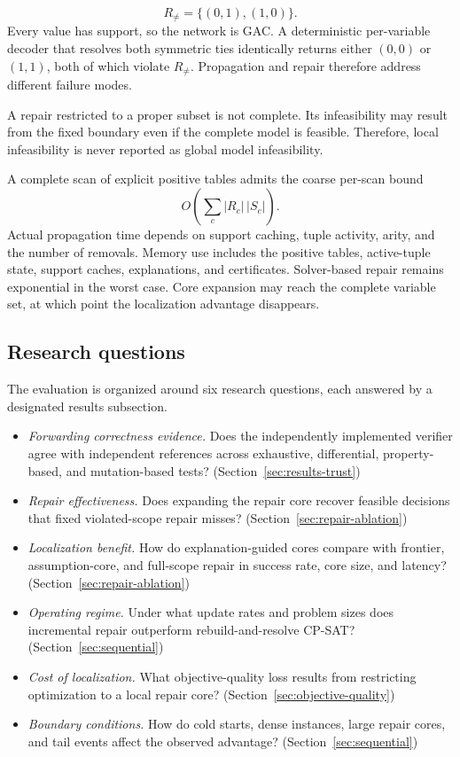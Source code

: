 \documentclass[pdflatex,sn-mathphys-num,iicol,oneside]{sn-jnl}
\newcommand{\gac}{\textsc{GAC}\xspace}
\newcommand{\cpsat}{\textsc{CP-SAT}\xspace}
\begin{document}
\[
R_{\neq}=\{(0,1),(1,0)\}.
\]
Every value has support, so the network is \gac. A deterministic
per-variable decoder that resolves both symmetric ties identically
returns either $(0,0)$ or $(1,1)$, both of which violate
$R_{\neq}$. Propagation and repair therefore address different
failure modes.

A repair restricted to a proper subset is not complete. Its
infeasibility may result from the fixed boundary even if the complete
model is feasible. Therefore, local infeasibility is never reported as
global model infeasibility.

A complete scan of explicit positive tables admits the coarse per-scan bound
\begin{equation}
O\left(
\sum_{c}
|R_c|\,|S_c|
\right).
\end{equation}
Actual propagation time depends on support caching, tuple activity,
arity, and the number of removals. Memory use includes the positive
tables, active-tuple state, support caches, explanations, and
certificates. Solver-based repair remains exponential in the worst
case. Core expansion may reach the complete variable set, at which
point the localization advantage disappears.

\subsection*{Research questions}
\label{sec:rqs}

The evaluation is organized around six research questions, each
answered by a designated results subsection.

\begin{itemize}[leftmargin=3.0em]
\item[\textbf{RQ1}] \emph{Forwarding correctness evidence.} Does the
independently implemented verifier agree with independent references
across exhaustive, differential, property-based, and mutation-based
tests? (Section~\ref{sec:results-trust})
\item[\textbf{RQ2}] \emph{Repair effectiveness.} Does expanding the
repair core recover feasible decisions that fixed violated-scope
repair misses? (Section~\ref{sec:repair-ablation})
\item[\textbf{RQ3}] \emph{Localization benefit.} How do
explanation-guided cores compare with frontier, assumption-core, and
full-scope repair in success rate, core size, and latency?
(Section~\ref{sec:repair-ablation})
\item[\textbf{RQ4}] \emph{Operating regime.} Under what update rates
and problem sizes does incremental repair outperform
rebuild-and-resolve \cpsat? (Section~\ref{sec:sequential})
\item[\textbf{RQ5}] \emph{Cost of localization.} What
objective-quality loss results from restricting optimization to a
local repair core? (Section~\ref{sec:objective-quality})
\item[\textbf{RQ6}] \emph{Boundary conditions.} How do cold starts,
dense instances, large repair cores, and tail events affect the
observed advantage? (Section~\ref{sec:sequential})
\end{itemize}
\end{document}
